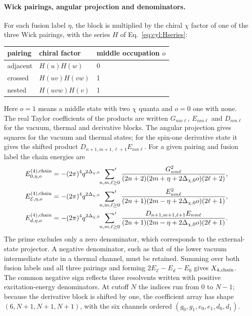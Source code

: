 \documentclass[11pt,a4paper]{article}
\numberwithin{equation}{section}
\begin{document}
\paragraph{Wick pairings, angular projection and denominators.} For each fusion label $\eta$, the block is multiplied
by the chiral $\chi$ factor of one of the three Wick pairings, with the series $H$ of Eq.~\eqref{eq:cyl:Hseries}:
\begin{center}\small
\begin{tabular}{@{}lll@{}}
\toprule
pairing & chiral factor & middle occupation $o$\\
\midrule
adjacent & $H(u)H(w)$ & 0\\
crossed & $H(uv)H(vw)$ & 1\\
nested & $H(uvw)H(v)$ & 1\\
\bottomrule
\end{tabular}
\end{center}
Here $o=1$ means a middle state with two $\chi$ quanta and $o=0$ one with none. The real Taylor coefficients of the
products are written $G_{nm\ell}$, $E_{nm\ell}$ and $D_{nm\ell}$ for the vacuum, thermal and derivative blocks. The
angular projection gives squares for the vacuum and thermal states; for the spin-one derivative state it gives the
shifted product $D_{n+1,m+1,\ell+1}E_{nm\ell}$. For a given pairing and fusion label the chain energies are
\begin{equation}
\begin{aligned}
 E_{0,\eta,o}^{(4),\rm chain}&=-(2\pi)^4q^{2\Delta_{\chi,0}}\sideset{}{'}\sum_{n,m,\ell\ge0}
 \frac{G_{nm\ell}^2}{(2n+2)(2m+\eta+2\Delta_{\chi,0}o)(2\ell+2)},\\
 E_{\mathcal E,\eta,o}^{(4),\rm chain}&=-(2\pi)^4q^{2\Delta_{\chi,0}}\sideset{}{'}\sum_{n,m,\ell\ge0}
 \frac{E_{nm\ell}^2}{(2n+1)(2m-\eta+2\Delta_{\chi,0}o)(2\ell+1)},\\
 E_{d,\eta,o}^{(4),\rm chain}&=-(2\pi)^4q^{2\Delta_{\chi,0}}\sideset{}{'}\sum_{n,m,\ell\ge0}
 \frac{D_{n+1,m+1,\ell+1}E_{nm\ell}}{(2n+1)(2m-\eta+2\Delta_{\chi,0}o)(2\ell+1)}.
\end{aligned}
\label{eq:cyl:chain}
\end{equation}
The prime excludes only a zero denominator, which corresponds to the external-state projector. A negative denominator,
such as that of the lower vacuum intermediate state in a thermal channel, must be retained. Summing over both fusion
labels and all three pairings and forming $2E_{\mathcal E}-E_d-E_0$ gives $X_{4,\rm chain}$. The common negative sign
reflects three resolvents written with positive excitation-energy denominators. At cutoff $N$ the indices run from 0 to
$N-1$; because the derivative block is shifted by one, the coefficient array has shape $(6,N+1,N+1,N+1)$, with the six
channels ordered $(g_0,g_1,e_0,e_1,d_0,d_1)$.
\end{document}
